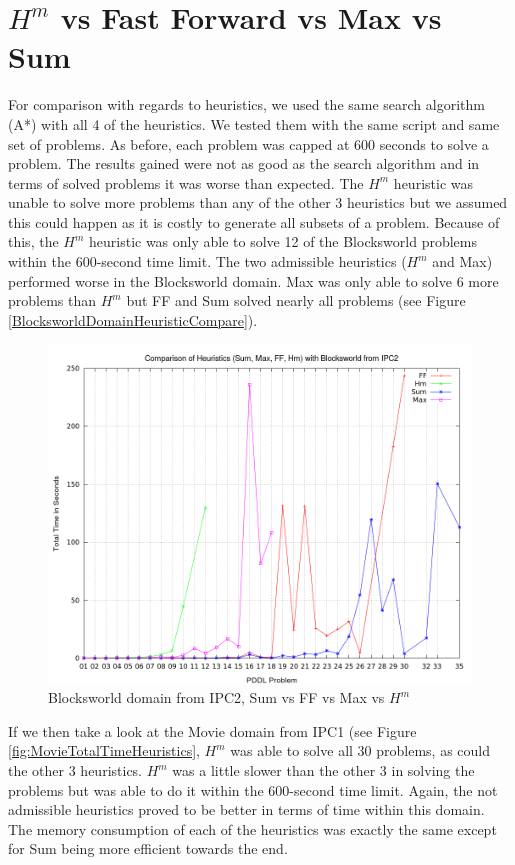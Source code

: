 \section{$H^m$ vs Fast Forward vs Max vs Sum}
For comparison with regards to heuristics, we used the same search algorithm (A*) with all 4 of the heuristics. We tested them with the same script and same set of problems. As before, each problem was capped at 600 seconds to solve a problem. The results gained were not as good as the search algorithm and in terms of solved problems it was worse than expected. The $H^m$ heuristic was unable to solve more problems than any of the other 3 heuristics but we assumed this could happen as it is costly to generate all subsets of a problem. Because of this, the $H^m$ heuristic was only able to solve 12 of the Blocksworld problems within the 600-second time limit. The two admissible heuristics ($H^m$ and Max) performed worse in the Blocksworld domain. Max was only able to solve 6 more problems than $H^m$ but FF and Sum solved nearly all problems (see Figure \ref{BlocksworldDomainHeuristicCompare}). 
\begin{figure}[!htb]
    \centering
    \includegraphics[scale=0.35]{BlocksworldTimeHeuristics.png}
    \caption{Blocksworld domain from IPC2, Sum vs FF vs Max vs $H^m$}
    \label{fig:BlocksworldDomainHeuristicCompare}
\end{figure}
If we then take a look at the Movie domain from IPC1 (see Figure \ref{fig:MovieTotalTimeHeuristics}, $H^m$ was able to solve all 30 problems, as could the other 3 heuristics. $H^m$ was a little slower than the other 3 in solving the problems but was able to do it within the 600-second time limit. Again, the not admissible heuristics proved to be better in terms of time within this domain. The memory consumption of each of the heuristics was exactly the same except for Sum being more efficient towards the end.

